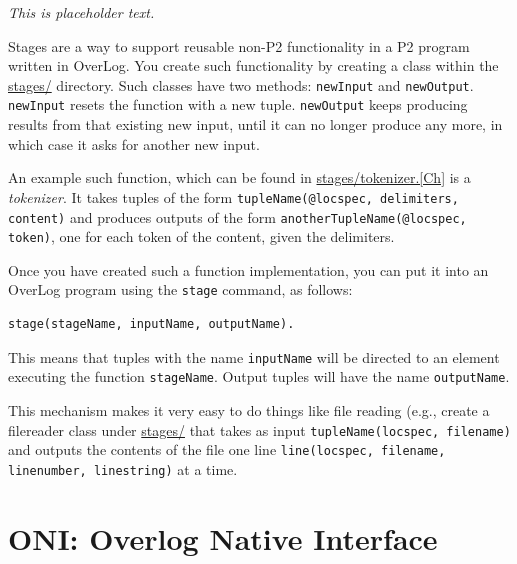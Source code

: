 \documentclass{article}
\begin{document}
\emph{This is placeholder text.}

Stages are a way to support reusable non-P2 functionality in a P2
program written in OverLog. You create such functionality by creating a
class within the \url{stages/} directory. Such classes have two methods:
\texttt{newInput} and \texttt{newOutput}. \texttt{newInput} resets the
function with a new tuple. \texttt{newOutput} keeps producing results
from that existing new input, until it can no longer produce any more,
in which case it asks for another new input. 

An example such function, which can be found in
\url{stages/tokenizer.[Ch]} is a \emph{tokenizer}. It takes tuples of
the form \lstinline$tupleName(@locspec, delimiters, content)$ and
produces outputs of the form
\lstinline$anotherTupleName(@locspec, token)$, one for each token of the content, given the delimiters. 

Once you have created such a function implementation, you can put it
into an OverLog program using the \lstinline$stage$ command, as follows: 
\begin{lstlisting}
stage(stageName, inputName, outputName).
\end{lstlisting}

This means that tuples with the name \lstinline$inputName$ will be
directed to an element executing the function
\lstinline$stageName$. Output tuples will have the name
\lstinline$outputName$. 

This mechanism makes it very easy to do things like file reading (e.g.,
create a filereader class under \url{stages/} that takes as input
\lstinline$tupleName(locspec, filename)$ and outputs the contents of the file one
line \lstinline$line(locspec, filename, linenumber, linestring)$ at a
time.

\section{ONI: Overlog Native Interface}
\end{document}
